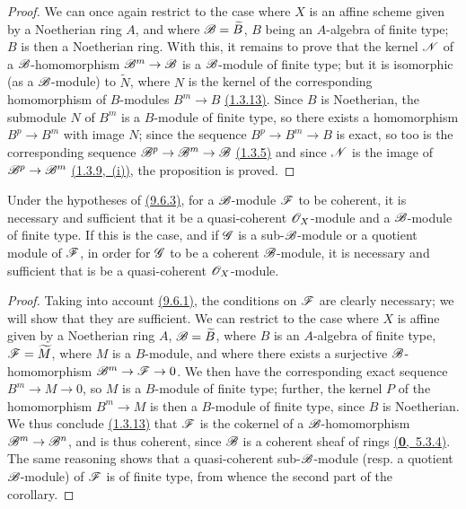 \begin{proof}
\label{proof-prop-1.9.6.3}
We can once again restrict to the case where $X$ is an affine scheme given by a Noetherian ring $A$, and where $\mathscr{B}=\widetilde{B}$, $B$ being an $A$-algebra of finite type; $B$ is then a Noetherian ring.
With this, it remains to prove that the kernel $\mathscr{N}$ of a $\mathscr{B}$-homomorphism $\mathscr{B}^m\to\mathscr{B}$ is a $\mathscr{B}$-module of finite type; but it is isomorphic (as a $\mathscr{B}$-module) to $\widetilde{N}$, where $N$ is the kernel of the corresponding homomorphism of $B$-modules $B^m\to B$ \hyperref[env-1.1.3.13]{(1.3.13)}.
Since $B$ is Noetherian, the submodule $N$ of $B^m$ is a $B$-module of finite type, so there exists a homomorphism $B^p\to B^m$ with image $N$; since the sequence $B^p\to B^m\to B$ is exact, so too is the corresponding sequence $\mathscr{B}^p\to\mathscr{B}^m\to\mathscr{B}$ \hyperref[prop-1.1.3.5]{(1.3.5)} and since $\mathscr{N}$ is the image of $\mathscr{B}^p\to\mathscr{B}^m$ \hyperref[cor-1.1.3.9]{(1.3.9,~(i))}, the proposition is proved.
\end{proof}

\begin{cor}[9.6.4]
\label{cor-1.9.6.4}
Under the hypotheses of \hyperref[prop-1.9.6.3]{(9.6.3)}, for a $\mathscr{B}$-module $\mathscr{F}$ to be coherent, it is necessary and sufficient that it be a quasi-coherent $\mathscr{O}_X$-module and a $\mathscr{B}$-module of finite type.
If this is the case, and if $\mathscr{G}$ is a sub-$\mathscr{B}$-module or a quotient module of $\mathscr{F}$, in order for $\mathscr{G}$ to be a coherent $\mathscr{B}$-module, it is necessary and sufficient that is be a quasi-coherent $\mathscr{O}_X$-module.
\end{cor}

\begin{proof}
\label{proof-cor-1.9.6.4}
Taking into account \hyperref[prop-1.9.6.1]{(9.6.1)}, the conditions on $\mathscr{F}$ are clearly necessary; we will show that they are sufficient.
We can restrict to the case where $X$ is affine given by a Noetherian ring $A$, $\mathscr{B}=\widetilde{B}$, where $B$ is an $A$-algebra of finite type, $\mathscr{F}=\widetilde{M}$, where $M$ is a $B$-module, and where there exists a surjective $\mathscr{B}$-homomorphism $\mathscr{B}^m\to\mathscr{F}\to0$.
We then have the corresponding exact sequence $B^m\to M\to0$, so $M$ is a $B$-module of finite type; further, the kernel $P$ of the homomorphism $B^m\to M$ is then a $B$-module of finite type, since $B$ is Noetherian.
We thus conclude \hyperref[env-1.1.3.13]{(1.3.13)} that $\mathscr{F}$ is the cokernel of a $\mathscr{B}$-homomorphism $\mathscr{B}^m\to\mathscr{B}^n$, and is thus coherent, since $\mathscr{B}$ is a coherent sheaf of rings \hyperref[env-0.5.3.4]{(\textbf{0},~5.3.4)}.
The same reasoning shows that a quasi-coherent sub-$\mathscr{B}$-module (resp. a quotient $\mathscr{B}$-module) of $\mathscr{F}$ is of finite type, from whence the second part of the corollary.
\end{proof}

